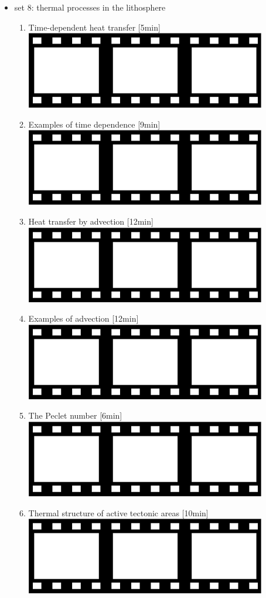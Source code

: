 \begin{itemize}
\item set 8: thermal processes in the lithosphere
\begin{enumerate}
\item Time-dependent heat transfer [5min] 
      \href{https://youtu.be/MnSOsi_SbO0?si=K1HgINqe5DN6dy5Y}{\includegraphics[width=.8cm]{images/pictograms/film.png}}
\item Examples of time dependence [9min] 
      \href{https://youtu.be/ymmgRKJMDyI?si=_SyMCY9wVHw03YRr}{\includegraphics[width=.8cm]{images/pictograms/film.png}}
\item Heat transfer by advection [12min] 
      \href{https://youtu.be/HZp38ToHFeI?si=7q2_nM-Knr1Tyb6Z}{\includegraphics[width=.8cm]{images/pictograms/film.png}}
\item Examples of advection [12min] 
      \href{https://youtu.be/IuC25LQ5GIw?si=uXxPoFCkJOOF0Q5c}{\includegraphics[width=.8cm]{images/pictograms/film.png}}
\item The Peclet number [6min] 
      \href{https://youtu.be/_-FfXUf863c?si=5-BgwSAHLUtc9XGH}{\includegraphics[width=.8cm]{images/pictograms/film.png}}
\item Thermal structure of active tectonic areas [10min] 
      \href{https://youtu.be/9QjN27oEDfY?si=zqHB-HjiXuIbhKkL}{\includegraphics[width=.8cm]{images/pictograms/film.png}}
\end{enumerate}


\end{itemize}
